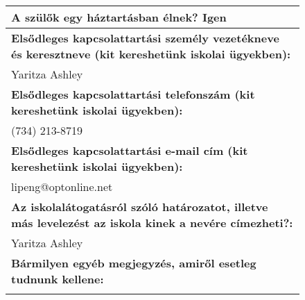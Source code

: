 \documentclass[10pt,a4paper]{article}
\begin{document}
\begin{figure}[!ht]
\begin{tabular}{|m{\textwidth}|}
\hline\vspace{3pt}
\textbf{A szülők egy háztartásban élnek? } \hspace{0.5cm} Igen \vspace{3pt} \\
\hline\vspace{3pt}
\textbf{Elsődleges kapcsolattartási személy vezetékneve és keresztneve (kit kereshetünk iskolai ügyekben):} \\ \hspace{0.5cm} Yaritza Ashley \vspace{3pt} \\
\hline\vspace{3pt}
\textbf{Elsődleges kapcsolattartási telefonszám (kit kereshetünk iskolai ügyekben):} \\ \hspace{0.5cm} (734) 213-8719 \vspace{3pt} \\
\hline\vspace{3pt}
\textbf{Elsődleges kapcsolattartási e-mail cím (kit kereshetünk iskolai ügyekben):} \\ \hspace{0.5cm} lipeng@optonline.net \vspace{3pt} \\
\hline\vspace{3pt}
\textbf{Az iskolalátogatásról szóló határozatot, illetve más levelezést az iskola kinek a nevére címezheti?:} \\ \hspace{0.5cm} Yaritza Ashley \vspace{3pt} \\
\hline\vspace{3pt}
\textbf{Bármilyen egyéb megjegyzés, amiről esetleg tudnunk kellene:} \\ \hspace{0.5cm}  \vspace{3pt} \\


\end{tabular}
\end{figure}
\end{document}

